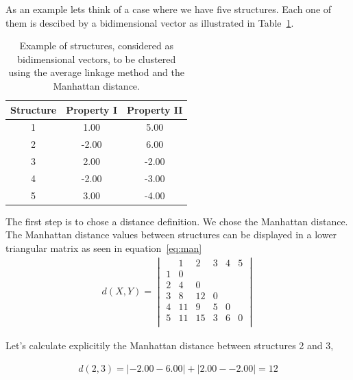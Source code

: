 As an example lets think of a case where we have five structures. Each
one of  them is descibed by  a bidimensional vector  as illustrated in
Table~\ref{tab:data}.
\begin{table}
\centering
\begin{tabular}[h]{|c|c|c|}
\hline
Structure & Property I & Property II\\
\hline\hline
1  &     1.00  &  5.00 \\
\hline
2  &    -2.00  & 6.00 \\
\hline
3  &      2.00  & -2.00 \\
\hline
4  &     -2.00  & -3.00 \\
\hline
5  &     3.00  &  -4.00 \\
\hline
\end{tabular}
\caption{Example of  structures, considered as  bidimensional vectors,
  to be clustered  using the average linkage method  and the Manhattan
  distance.}
\label{tab:data}
\end{table}

The  first step  is  to chose  a  distance definition.   We chose  the
Manhattan distance.  The Manhattan distance  values between structures
can  be   displayed  in   a  lower  triangular   matrix  as   seen  in
equation~\ref{eq:man}
\begin{gather} 
d(X, Y)=
\begin{vmatrix}
   & 1  &  2   & 3 & 4 & 5 \\
1  & 0  &      &   &   &   \\
2  & 4  &  0   &   &   &   \\
3  & 8  & 12   & 0 &   &   \\
4  & 11 &  9   & 5 & 0 &   \\
5  & 11 & 15   & 3 & 6 & 0 \\
\end{vmatrix}
\label{eq:man}
\end{gather}

Let's calculate explicitily  the Manhattan distance between structures
2 and 3,

\begin{gather}
d(2, 3)= |-2.00 - 6.00| + |2.00 - -2.00| = 12
\end{gather}

